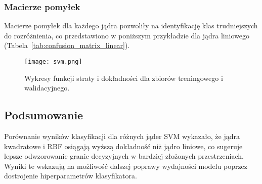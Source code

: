 \subsubsection{Macierze pomyłek}
Macierze pomyłek dla każdego jądra pozwoliły na identyfikację klas trudniejszych do rozróżnienia, co przedstawiono w poniższym przykładzie dla jądra liniowego (Tabela~\ref{tab:confusion_matrix_linear}).
\begin{figure}[h!]
    \centering
    \texttt{[image: svm.png]}
    \caption{Wykresy funkcji straty i dokładności dla zbiorów treningowego i walidacyjnego.}
    \label{fig:loss_accuracy}
\end{figure}

\subsection{Podsumowanie}
Porównanie wyników klasyfikacji dla różnych jąder SVM wykazało, że jądra kwadratowe i RBF osiągają wyższą dokładność niż jądro liniowe, co sugeruje lepsze odwzorowanie granic decyzyjnych w bardziej złożonych przestrzeniach. Wyniki te wskazują na możliwość dalszej poprawy wydajności modelu poprzez dostrojenie hiperparametrów klasyfikatora.
